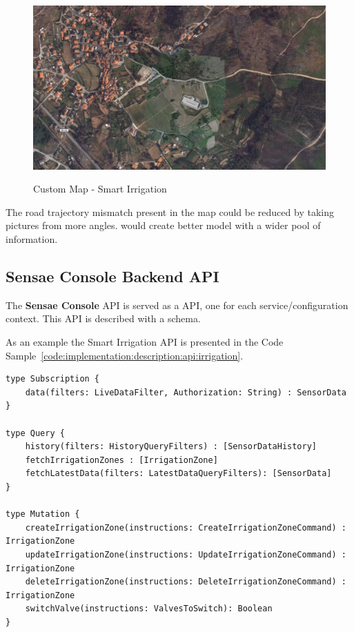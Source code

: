 \begin{figure}[H]
    \centering
    \resizebox{\columnwidth}{!}
    {
       \includegraphics{assets/figures/maps/custom-map.png}
    }
    \caption[Custom Map - Smart Irrigation]{Custom Map - Smart Irrigation}
    \label{fig:implementation:description:maps:irrig}
\end{figure}

The road trajectory mismatch present in the map could be reduced by taking pictures from more angles.  would create better model with a wider pool of information.

\subsection{Sensae Console Backend API}
\label{subsec:implementation:description:api}

The \textbf{Sensae Console} \gls{API} is served as a  \gls{API}, one for each service/configuration context. This \gls{API} is described with a schema.

As an example the Smart Irrigation API is presented in the Code Sample~\ref{code:implementation:description:api:irrigation}. 

\begin{lstlisting}[caption=Smart Irrigation API Schema, label={code:implementation:description:api:irrigation}]
type Subscription {
    data(filters: LiveDataFilter, Authorization: String) : SensorData
}

type Query {
    history(filters: HistoryQueryFilters) : [SensorDataHistory]
    fetchIrrigationZones : [IrrigationZone]
    fetchLatestData(filters: LatestDataQueryFilters): [SensorData]
}

type Mutation {
    createIrrigationZone(instructions: CreateIrrigationZoneCommand) : IrrigationZone
    updateIrrigationZone(instructions: UpdateIrrigationZoneCommand) : IrrigationZone
    deleteIrrigationZone(instructions: DeleteIrrigationZoneCommand) : IrrigationZone
    switchValve(instructions: ValvesToSwitch): Boolean
}        
\end{lstlisting}

